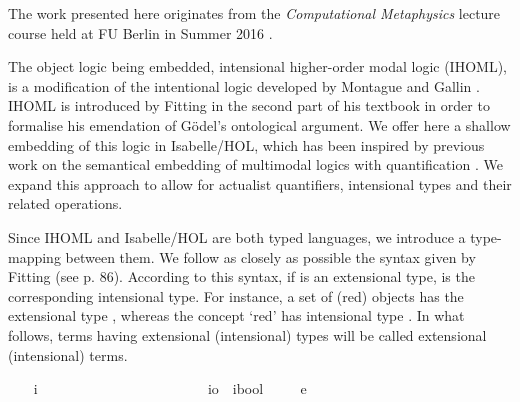 \begin{isabellebody}
\begin{isamarkuptext}
\end{isamarkuptext}\isamarkuptrue%
%
\begin{isamarkuptext}%
The work presented here originates from the \emph{Computational Metaphysics} lecture course  
held at FU Berlin in Summer 2016 \cite{C65}.%
\end{isamarkuptext}\isamarkuptrue%
%
\isamarkuptrue%
%
\begin{isamarkuptext}%
The object logic being embedded, intensional higher-order modal logic (IHOML), is a modification of the intentional logic developed by Montague
and Gallin \cite{Gallin75}. IHOML is introduced by Fitting in the second part of his textbook \cite{Fitting}
in order to formalise his emendation of G\"odel's ontological argument. We offer here a shallow embedding
of this logic in Isabelle/HOL, which has been inspired by previous work on the semantical embedding of
multimodal logics with quantification \cite{J23}. We expand this approach to allow for actualist quantifiers,
intensional types and their related operations.%
\end{isamarkuptext}\isamarkuptrue%
%
\isamarkuptrue%
%
\begin{isamarkuptext}%
Since IHOML and Isabelle/HOL are both typed languages, we introduce a type-mapping between them.
We follow as closely as possible the syntax given by Fitting (see p. 86). According to this syntax,
if \isa{{\isasymtau}} is an extensional type, \isa{{\isasymup}{\isasymtau}} is the corresponding intensional type. For instance,
a set of (red) objects has the extensional type \isa{{\isasymlangle}{\isasymzero}{\isasymrangle}}, whereas the concept `red' has intensional type \isa{{\isasymup}{\isasymlangle}{\isasymzero}{\isasymrangle}}.
In what follows, terms having extensional (intensional) types will be called extensional (intensional) terms.%
\end{isamarkuptext}\isamarkuptrue%
\ \ \isamarkupfalse%
\ i\ \ \ \ \ \ \ \ \ \ \ \ \ \ \ \ \ \ \ \ %
\isanewline
\ \ \isamarkupfalse%
\ io\ {\isacharequal}\ {\isachardoublequoteopen}{\isacharparenleft}i{\isasymRightarrow}bool{\isacharparenright}{\isachardoublequoteclose}\ %
\isanewline
\ \ \isamarkupfalse%
\ e\ \ {\isacharparenleft}{\isachardoublequoteopen}{\isasymzero}{\isachardoublequoteclose}{\isacharparenright}\ \ \ \ \ \ \ \ \ \ \ \ \ %

\end{isabellebody}
